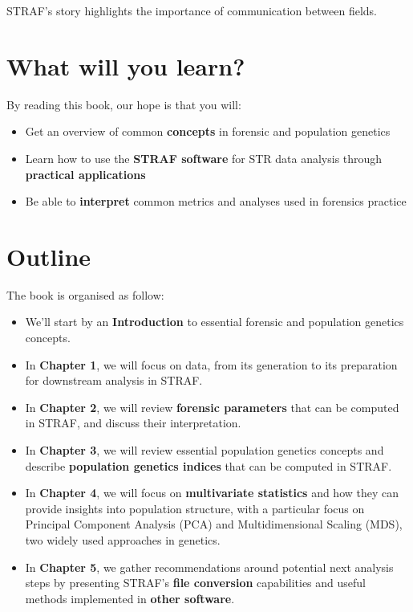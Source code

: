 \documentclass[
  a5paper]{book}
\begin{document}
STRAF's story highlights the importance of communication between fields.

\hypertarget{what-will-you-learn}{%
\section*{What will you learn?}\label{what-will-you-learn}}

By reading this book, our hope is that you will:

\begin{itemize}
\item
  Get an overview of common \textbf{concepts} in forensic and population genetics
\item
  Learn how to use the \textbf{STRAF software} for STR data analysis through \textbf{practical applications}
\item
  Be able to \textbf{interpret} common metrics and analyses used in forensics practice
\end{itemize}

\hypertarget{outline}{%
\section*{Outline}\label{outline}}

The book is organised as follow:

\begin{itemize}
\item
  We'll start by an \textbf{Introduction} to essential forensic and population genetics concepts.
\item
  In \textbf{Chapter 1}, we will focus on data, from its generation to its preparation for
  downstream analysis in STRAF.
\item
  In \textbf{Chapter 2}, we will review \textbf{forensic parameters} that can be computed in STRAF,
  and discuss their interpretation.
\item
  In \textbf{Chapter 3}, we will review essential population genetics concepts and
  describe \textbf{population genetics indices} that can be computed in STRAF.
\item
  In \textbf{Chapter 4}, we will focus on \textbf{multivariate statistics} and how they can provide
  insights into population structure, with a particular focus on Principal Component
  Analysis (PCA) and Multidimensional Scaling (MDS), two widely used approaches in genetics.
\item
  In \textbf{Chapter 5}, we gather recommendations around potential next analysis steps
  by presenting STRAF's \textbf{file conversion} capabilities and useful methods implemented in
  \textbf{other software}.
\end{itemize}
\end{document}
